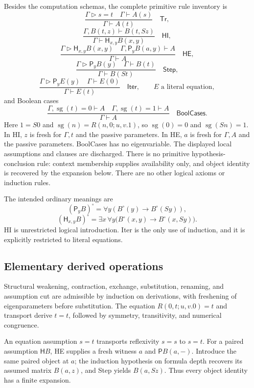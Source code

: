 Besides the computation schemas, the complete primitive rule inventory is
\[
 \frac{\Gamma\mathrel{\triangleright}s=t\quad
       \Gamma\vdash A(s)}{\Gamma\vdash A(t)}
 \quad\mathsf{Tr},
\]
\[
 \frac{\Gamma,B(t,z)\vdash B(t,Sz)}
      {\Gamma\vdash\mathsf H_{x,y}B(x,y)}
 \quad\mathsf{HI},
\]
\[
 \frac{\Gamma\mathrel{\triangleright}\mathsf H_{x,y}B(x,y)
       \quad\Gamma,\mathsf P_yB(a,y)\vdash A}
      {\Gamma\vdash A}
 \quad\mathsf{HE},
\]
\[
 \frac{\Gamma\mathrel{\triangleright}\mathsf P_yB(y)
       \quad\Gamma\vdash B(t)}
      {\Gamma\vdash B(St)}
 \quad\mathsf{Step},
\]
\[
 \frac{\Gamma\mathrel{\triangleright}\mathsf P_yE(y)
       \quad\Gamma\vdash E(0)}
      {\Gamma\vdash E(t)}
 \quad\mathsf{Iter},
 \qquad E\text{ a literal equation},
\]
and Boolean cases
\[
 \frac{\Gamma,\operatorname{sg}(t)=0\vdash A\quad
       \Gamma,\operatorname{sg}(t)=1\vdash A}
      {\Gamma\vdash A}
 \quad\mathsf{BoolCases}.
\]
Here $1=S0$ and $\operatorname{sg}(n)=R(n,0;u,v.1)$, so
$\operatorname{sg}(0)=0$ and $\operatorname{sg}(Sn)=1$.
In HI, $z$ is fresh for $\Gamma,t$ and the passive parameters.
In HE, $a$ is fresh for $\Gamma,A$ and the passive parameters.
BoolCases has no eigenvariable.  The displayed local
assumptions and clauses are discharged.  There is no primitive
hypothesis-conclusion rule: context membership supplies availability
only, and object identity is recovered by the expansion below.
There are no other logical axioms or induction rules.

The intended ordinary meanings are
\[
 (\mathsf P_yB)^\circ=\forall y(B^\circ(y)\to B^\circ(Sy)),
\]
\[
 (\mathsf H_{x,y}B)^\circ
   =\exists x\,\forall y\bigl(B^\circ(x,y)\to B^\circ(x,Sy)\bigr).
 \tag{Meaning}
\]
HI is unrestricted logical introduction.  Iter is the only use of
induction, and it is explicitly restricted to literal equations.

\subsection{Elementary derived operations}

Structural weakening, contraction, exchange, substitution, renaming,
and assumption cut are admissible by induction on derivations, with
freshening of eigenparameters before substitution.  The equation
$R(0,t;u,v.0)=t$ and transport derive $t=t$, followed by symmetry,
transitivity, and numerical congruence.

An equation assumption $s=t$ transports reflexivity $s=s$ to $s=t$.
For a paired assumption
$\mathsf H B$, HE supplies a fresh witness $a$ and $\mathsf P B(a,-)$.
Introduce the same paired object at $a$; the induction hypothesis on
formula depth recovers its assumed matrix $B(a,z)$, and Step yields
$B(a,Sz)$.  Thus every object identity has a finite expansion.

